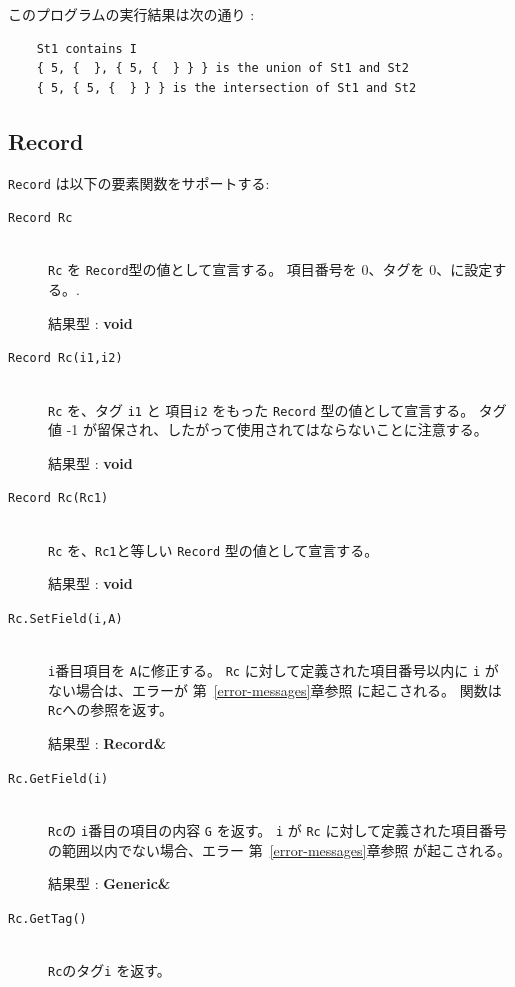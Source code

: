 \documentclass[\pformat,12pt]{jarticle}
\begin{document}
\noindent このプログラムの実行結果は次の通り :

\begin{verbatim}
    St1 contains I
    { 5, {  }, { 5, {  } } } is the union of St1 and St2
    { 5, { 5, {  } } } is the intersection of St1 and St2
\end{verbatim}

\subsection{Record}
{\tt Record} は以下の要素関数をサポートする:
\vspace{0.5cm}

\begin{description}
\item[{\tt Record Rc}] \mbox{}\\
      {\tt Rc} を {\tt Record}型の値として宣言する。
項目番号を 0、タグを 0、に設定する。.

    結果型 : {\bf void}

\item[{\tt Record Rc(i1,i2)}] \mbox{}\\
      {\tt Rc} を、タグ {\tt i1} と 項目{\tt i2} をもった {\tt Record} 型の値として宣言する。
タグ値 -1 が留保され、したがって使用されてはならないことに注意する。

     結果型 : {\bf void}

\item[{\tt Record Rc(Rc1)}] \mbox{}\\
      {\tt Rc} を、{\tt Rc1}と等しい {\tt Record} 型の値として宣言する。

     結果型 : {\bf void}

\item[{\tt Rc.SetField(i,A)}] \mbox{}\\
    {\tt i}番目項目を {\tt A}に修正する。
 {\tt Rc} に対して定義された項目番号以内に {\tt i} がない場合は、エラーが 第~\ref{error-messages}章参照 に起こされる。 
    関数は{\tt Rc}への参照を返す。

     結果型 : {\bf Record\&}

\item[{\tt Rc.GetField(i)}] \mbox{}\\
   {\tt Rc}の  {\tt i}番目の項目の内容 {\tt G} を返す。
    {\tt i} が  {\tt Rc} に対して定義された項目番号の範囲以内でない場合、エラー 第~\ref{error-messages}章参照 が起こされる。

     結果型 : {\bf Generic\&}

\item[{\tt Rc.GetTag()}] \mbox{}\\
   {\tt Rc}のタグ{\tt i} を返す。


\end{description}
\end{document}
